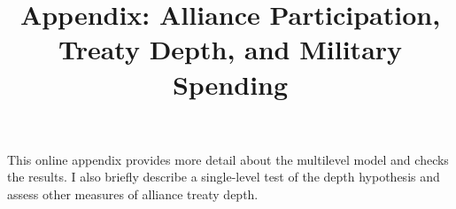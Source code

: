 \documentclass[12pt]{article}
\title{\textbf{Appendix: Alliance Participation, Treaty Depth, and Military Spending}}
\date{}
\begin{document}
\maketitle 

\singlespace 

This online appendix provides more detail about the multilevel model and checks the results. 
I also briefly describe a single-level test of the depth hypothesis and assess other measures of alliance treaty depth. 


%
%
%
%
%
%
\end{document}
